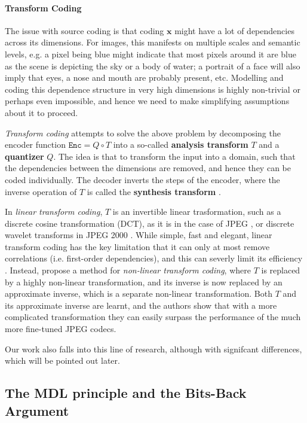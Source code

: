 \documentclass{article}
\renewcommand{\vec}[1]{\mathbf{#1}}
\newcommand{\Enc}{\mathtt{Enc}}
\begin{document}
\paragraph{Transform Coding}
The issue with source coding is that coding $\vec{x}$ might have a lot of
dependencies across its dimensions. For images, this manifests on multiple
scales and semantic levels, e.g. a pixel being blue might indicate that most
pixels around it are blue as the scene is depicting the sky or a body of water;
a portrait of a face will also imply that eyes, a nose and mouth are probably
present, etc. Modelling and coding this dependence structure in very high
dimensions is highly non-trivial or perhaps even impossible, and hence we need
to make simplifying assumptions about it to proceed.
\par
\textit{Transform coding} attempts to solve the above problem by decomposing the
encoder function $\Enc = Q \circ T$ into a so-called \textbf{analysis transform}
$T$ and a \textbf{quantizer} $Q$. The idea is that to transform the input into a
domain, such that the dependencies between the dimensions are removed, and hence
they can be coded individually. The decoder inverts the steps of the encoder,
where the inverse operation of $T$ is called the \textbf{synthesis transform}
\cite{gupta2011modified}.
\par
In \textit{linear transform coding}, $T$ is an invertible linear trasformation,
such as a discrete cosine transformation (DCT), as it is in the case of JPEG
\cite{wallace1992jpeg}, or discrete wavelet transforms in JPEG 2000
\cite{rabbani2002overview}. While simple, fast and elegant, linear transform
coding has the key limitation that it can only at most remove correlations (i.e.
first-order dependencies), and this can severly limit its efficiency
\cite{balle2016endtrans}. Instead, \cite{balle2016endtrans} propose a method for
\textit{non-linear transform coding}, where $T$ is replaced by a highly
non-linear transformation, and its inverse is now replaced by an approximate
inverse, which is a separate non-linear transformation. Both $T$ and its
approximate inverse are learnt, and the authors show that with a more
complicated transformation they can easily surpass the performance of the much
more fine-tuned JPEG codecs.
\par
Our work also falls into this line of research, although with signifcant
differences, which will be pointed out later.
\subsection{The MDL principle and the Bits-Back Argument}
\label{sec:mdl}
\end{document}
